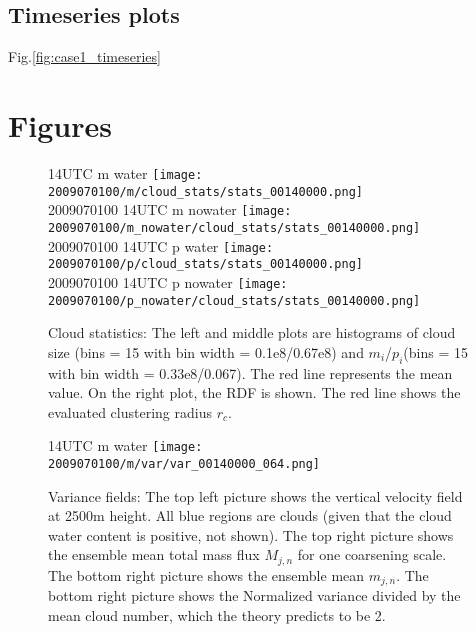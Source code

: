 \documentclass[a4paper, 12pt, draft]{article}
\begin{document}
\subsection{Timeseries plots}
Fig.\ref{fig:case1_timeseries}




\newpage

{\small
 }

\newpage
\section{Figures}


\begin{figure}[ht] \label{fig:case1_stats}
\noindent {} 14UTC m water
\texttt{[image: 2009070100/m/cloud\_stats/stats\_00140000.png]}\\
2009070100 14UTC m nowater
\texttt{[image: 2009070100/m\_nowater/cloud\_stats/stats\_00140000.png]}\\
2009070100 14UTC p water
\texttt{[image: 2009070100/p/cloud\_stats/stats\_00140000.png]}\\
2009070100 14UTC p nowater
\texttt{[image: 2009070100/p\_nowater/cloud\_stats/stats\_00140000.png]}\\
\caption{Cloud statistics: The left and middle plots are histograms of cloud size (bins = 15 with bin width = 0.1e8/0.67e8) and $m_i$/$p_i$(bins = 15 with bin width = 0.33e8/0.067). The red line represents the mean value. On the right plot, the RDF is shown. The red line shows the evaluated clustering radius $r_c$.}
\end{figure}

\begin{figure}[ht] \label{fig:case1_var_fields}
\noindent {} 14UTC m water
\texttt{[image: 2009070100/m/var/var\_00140000\_064.png]}\\
\caption{Variance fields:  The top left picture shows the vertical velocity field at 2500m height. All blue regions are clouds (given that the cloud water content is positive, not shown). The top right picture shows the ensemble mean total mass flux $M_{j,n}$ for one coarsening scale. The bottom right picture shows the ensemble mean $m_{j,n}$. The bottom right picture shows the Normalized variance divided by the mean cloud number, which the theory predicts to be 2.}
\end{figure}
\end{document}
